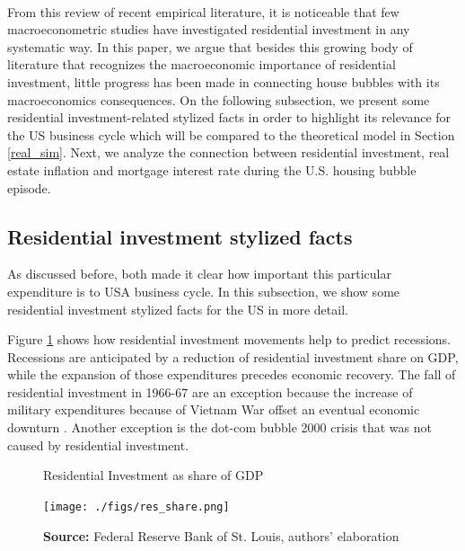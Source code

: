 \documentclass[12pt]{article}
\begin{document}
\\
From this review of recent empirical literature, it is noticeable that few macroeconometric studies have investigated residential investment in any systematic way.
In this paper, we argue that besides this growing body of literature that recognizes the macroeconomic importance of residential investment, little progress has been made in connecting house bubbles with its macroeconomics consequences.
On the following subsection, we present some residential investment-related stylized facts in order to highlight its relevance for the US business cycle which will be compared to the theoretical model in Section \ref{real_sim}.
Next, we analyze the connection between residential investment, real estate inflation and mortgage interest rate during the U.S. housing bubble episode.

\subsection{Residential investment stylized facts}
\label{sec:org874b1ea}

As discussed before, both \textcites{green_follow_1997}{leamer_housing_2007} made it clear how important this particular expenditure is to USA business cycle. In this subsection, we show some residential investment stylized facts for the US in more detail.

Figure \ref{Investo_Resid_GDP} shows how residential investment movements help to predict recessions. Recessions are anticipated by a reduction of residential investment share on GDP, while the expansion of those expenditures precedes economic recovery. The fall of residential investment in 1966-67 are an exception because the increase of military expenditures because of Vietnam War offset an eventual economic downturn \cite[p.~20]{leamer_housing_2007}. Another exception is the dot-com bubble 2000 crisis that was not caused by residential investment.



\begin{figure}[htb]
    \centering
        \caption{Residential Investment as share of GDP}
        \label{Investo_Resid_GDP}
    \texttt{[image: ./figs/res\_share.png]}
    \caption*{\textbf{Source:} Federal Reserve Bank of St. Louis, authors’ elaboration}
\end{figure}
\end{document}
